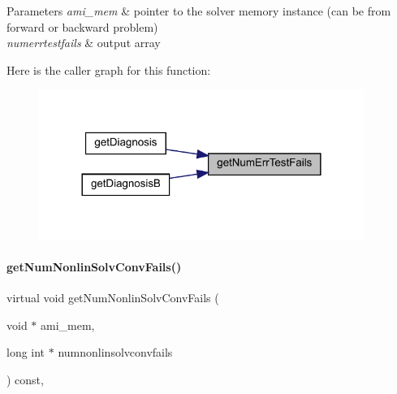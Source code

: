 \begin{DoxyParams}{Parameters}
{\em ami\+\_\+mem} & pointer to the solver memory instance (can be from forward or backward problem) \\
\hline
{\em numerrtestfails} & output array \\
\hline
\end{DoxyParams}
Here is the caller graph for this function\+:
\nopagebreak
\begin{figure}[H]
\begin{center}
\leavevmode
\includegraphics[width=300pt]{classamici_1_1_solver_a605fc85e2d8183dca4ebe24f9d810516_icgraph}
\end{center}
\end{figure}
\mbox{\label{classamici_1_1_solver_a34f79927b47e70db74f77943936e18b0}} 
\paragraph{\texorpdfstring{getNumNonlinSolvConvFails()}{getNumNonlinSolvConvFails()}}
{\footnotesize\ttfamily virtual void get\+Num\+Nonlin\+Solv\+Conv\+Fails (\begin{DoxyParamCaption}\item[{void $\ast$}]{ami\+\_\+mem,  }\item[{long int $\ast$}]{numnonlinsolvconvfails }\end{DoxyParamCaption}) const\hspace{0.3cm}{\ttfamily [protected]}, {}}


